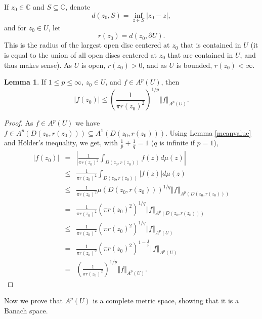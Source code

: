 \documentclass{article}
\newcommand{\norm}[1]{\left\Vert #1 \right\Vert}
\theoremstyle{definition}
\newtheorem{lemma}[theorem]{Lemma}
\begin{document}
If $z_0 \in \mathbb{C}$ and $S \subseteq \mathbb{C}$, denote
\[
d(z_0,S)=\inf_{z \in S} |z_0-z|,
\]
and for $z_0 \in U$, let
\[
r(z_0)=d(z_0,\partial U).
\]
This is the radius of the largest open disc centered at $z_0$ that is contained in $U$ (it is equal to the union of all open discs centered
at $z_0$ that are contained in $U$, and thus makes sense). As $U$ is open, $r(z_0)>0$, and as $U$ is bounded, $r(z_0)<\infty$.

\begin{lemma}
If $1 \leq p\leq \infty$,
$z_0 \in U$, and $f \in A^p(U)$, then
\[
|f(z_0)| \leq \left(\frac{1}{\pi r(z_0)^2}\right)^{1/p} \norm{f}_{A^p(U)}.
\]
\label{discinequality}
\end{lemma}
\begin{proof}
As $f \in A^p(U)$ we have $f \in A^p(D(z_0,r(z_0))) \subseteq A^1(D(z_0,r(z_0)))$.
Using Lemma \ref{meanvalue} and H\"older's inequality, we get, with $\frac{1}{p}+\frac{1}{q}=1$ ($q$ is infinite if $p=1$),
\begin{eqnarray*}
|f(z_0)|&=&\left| \frac{1}{\pi r(z_0)^2} \int_{D(z_0,r(z_0))} f(z) d\mu(z) \right|\\
&\leq& \frac{1}{\pi r(z_0)^2} \int_{D(z_0,r(z_0))} |f(z)| d\mu(z)\\
&\leq& \frac{1}{\pi r(z_0)^2} \mu(D(z_0,r(z_0)))^{1/q} \norm{f}_{A^p(D(z_0,r(z_0)))}\\
&=&\frac{1}{\pi r(z_0)^2} (\pi r(z_0)^2)^{1/q} \norm{f}_{A^p(D(z_0,r(z_0)))}\\
&\leq&\frac{1}{\pi r(z_0)^2} (\pi r(z_0)^2)^{1/q} \norm{f}_{A^p(U)}\\
&=&\frac{1}{\pi r(z_0)^2} (\pi r(z_0)^2)^{1-\frac{1}{p}} \norm{f}_{A^p(U)}\\
&=&\left(\frac{1}{\pi r(z_0)^2}\right)^{1/p} \norm{f}_{A^p(U)}.
\end{eqnarray*}
\end{proof}

Now we prove that $A^p(U)$ is a complete metric space, showing that it is a Banach space.
\end{document}
